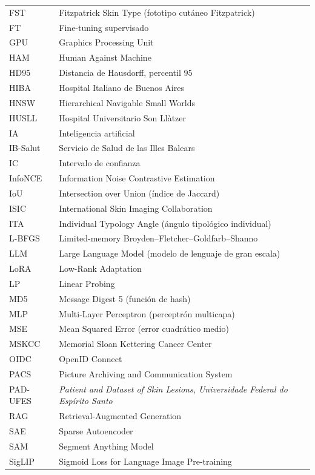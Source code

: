 \begin{longtable}{p{}p{}}
FST & Fitzpatrick Skin Type (fototipo cutáneo Fitzpatrick) \\
FT & Fine-tuning supervisado \\
GPU & Graphics Processing Unit \\
HAM & Human Against Machine \\
HD95 & Distancia de Hausdorff, percentil $95$ \\
HIBA & Hospital Italiano de Buenos Aires \\
HNSW & Hierarchical Navigable Small Worlds \\
HUSLL & Hospital Universitario Son Llàtzer \\
IA & Inteligencia artificial \\
IB-Salut & Servicio de Salud de las Illes Balears \\
IC & Intervalo de confianza \\
InfoNCE & Information Noise Contrastive Estimation \\
IoU & Intersection over Union (índice de Jaccard) \\
ISIC & International Skin Imaging Collaboration \\
ITA & Individual Typology Angle (ángulo tipológico individual) \\
L-BFGS & Limited-memory Broyden--Fletcher--Goldfarb--Shanno \\
LLM & Large Language Model (modelo de lenguaje de gran escala) \\
LoRA & Low-Rank Adaptation \\
LP & Linear Probing \\
MD5 & Message Digest 5 (función de hash) \\
MLP & Multi-Layer Perceptron (perceptrón multicapa) \\
MSE & Mean Squared Error (error cuadrático medio) \\
MSKCC & Memorial Sloan Kettering Cancer Center \\
OIDC & OpenID Connect \\
PACS & Picture Archiving and Communication System \\
PAD-UFES & \emph{Patient and Dataset of Skin Lesions, Universidade Federal do Espírito Santo} \\
RAG & Retrieval-Augmented Generation \\
SAE & Sparse Autoencoder \\
SAM & Segment Anything Model \\
SigLIP & Sigmoid Loss for Language Image Pre-training \\

\end{longtable}
